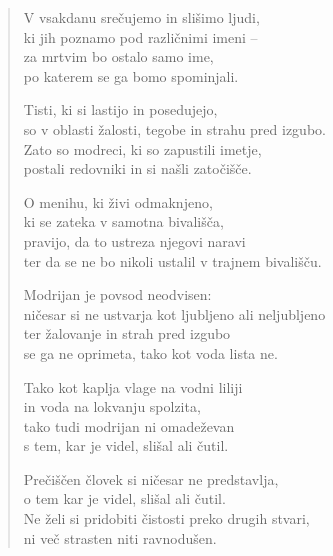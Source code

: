 \clearpage
\begin{verse}

V vsakdanu srečujemo in slišimo ljudi,\\
ki jih poznamo pod različnimi imeni --\\
za mrtvim bo ostalo samo ime,\\
po katerem se ga bomo spominjali.

Tisti, ki si lastijo in posedujejo,\\
so v oblasti žalosti, tegobe in strahu pred izgubo.\\
Zato so modreci, ki so zapustili imetje,\\
postali redovniki in si našli zatočišče.

O menihu, ki živi odmaknjeno,\\
ki se zateka v samotna bivališča,\\
pravijo, da to ustreza njegovi naravi\\
ter da se ne bo nikoli ustalil v trajnem bivališču.

Modrijan je povsod neodvisen:\\
ničesar si ne ustvarja kot ljubljeno ali neljubljeno\\
ter žalovanje in strah pred izgubo\\
se ga ne oprimeta, tako kot voda lista ne.

Tako kot kaplja vlage na vodni liliji\\
in voda na lokvanju spolzita,\\
tako tudi modrijan ni omadeževan\\
s tem, kar je videl, slišal ali čutil.

Prečiščen človek si ničesar ne predstavlja,\\
o tem kar je videl, slišal ali čutil.\\
Ne želi si pridobiti čistosti preko drugih stvari,\\
ni več strasten niti ravnodušen.

\end{verse}


